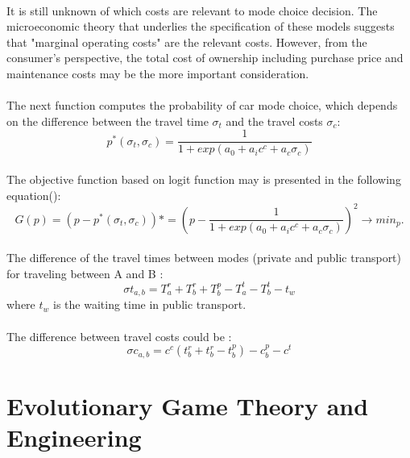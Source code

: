 \paragraph{}It is still unknown of which costs are relevant to mode choice decision. The microeconomic theory that underlies the specification of these models suggests that "marginal operating costs" are the relevant costs. However, from the consumer's perspective, the total cost of ownership including purchase price and maintenance costs may be the more important consideration.  
\paragraph{}The next function computes the probability of car mode choice, which depends on the difference between the travel time $\sigma_t$ and the travel costs $\sigma_c$:
\begin{equation}
p^{*}(\sigma_t,\sigma_c) = \frac{1}{1+exp(a_0+ a_i c^c + a_c \sigma_c)}
\end{equation}
\paragraph{}The objective function based on logit function may is presented in the following equation(\cite{Hollander et al, 2006}):
\begin{equation}
G(p) = (p - p^{*}(\sigma_t,\sigma_c))*
	 = (p - \frac{1}{1+exp(a_0+ a_i c^c + a_c \sigma_c)})^2 \rightarrow min_p.
\end{equation}
\paragraph{}The difference of the travel times between modes (private
and public transport) for traveling between A and B :
\begin{equation}
\sigma t_{a,b} = T^{r}_a + T^{r}_b + T^{p}_b - T^{t}_a - T^{t}_b - t_w
\end{equation}
where $t_w$ is the waiting time in public transport.
\paragraph{}The difference between travel costs could be : 
\begin{equation}
\sigma c_{a,b} = c^{c} ( t^{r}_b + t^{r}_b - t^{p}_b )- c^{p}_b - c^t
\end{equation}

\section{Evolutionary Game Theory and Engineering}
